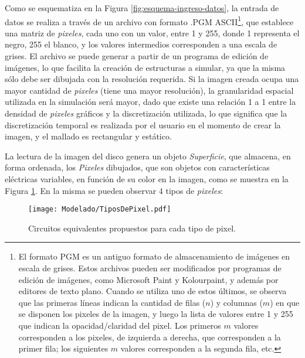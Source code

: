 Como se esquematiza en la Figura \ref{fig:esquema-ingreso-datos}, la entrada de datos se realiza a través de un archivo con formato \textsc{.PGM} ASCII\footnote{El formato PGM es un antiguo formato de almacenamiento de imágenes en escala de grises. Estos archivos pueden ser modificados por programas de edición de imágenes, como Microsoft Paint y Kolourpaint, y además por editores de texto plano. Cuando se utiliza uno de estos últimos, se observa que las primeras líneas indican la cantidad de filas ($n$) y columnas ($m$) en que se disponen los pixeles de la imagen, y luego la lista de valores entre 1 y 255 que indican la opacidad/claridad del pixel. Los primeros $m$ valores corresponden a los pixeles, de izquierda a derecha, que corresponden a la primer fila; los siguientes $m$ valores corresponden a la segunda fila, etc.}, que establece una matriz de \textit{pixeles}, cada uno con un valor, entre 1 y 255, donde 1 representa el negro, 255 el blanco, y los valores intermedios corresponden a una escala de grises. El archivo se puede generar a partir de un programa de edición de imágenes, lo que facilita la creación de estructuras a simular, ya que la misma sólo debe ser dibujada con la resolución requerida. Si la imagen creada ocupa una mayor cantidad de \textit{pixeles} (tiene una mayor resolución), la granularidad espacial utilizada en la simulación será mayor, dado que existe una relación 1 a 1 entre la densidad de \textit{pixeles} gráficos y la discretización utilizada, lo que significa que la discretización temporal es realizada por el usuario en el momento de crear la imagen, y el mallado es rectangular y estático.

La lectura de la imagen del disco genera un objeto \textit{Superficie}, que almacena, en forma ordenada, los \textit{Pixeles} dibujados, que son objetos con características eléctricas variables, en función de su color en la imagen, como se muestra en la Figura \ref{fig:tiposdepixeles}. En la misma se pueden observar 4 tipos de \textit{pixeles}:

\begin{figure}[h]
	\centering
	\texttt{[image: Modelado/TiposDePixel.pdf]}
	\caption{Circuitos equivalentes propuestos para cada tipo de pixel.}
	\label{fig:tiposdepixeles}
\end{figure}

